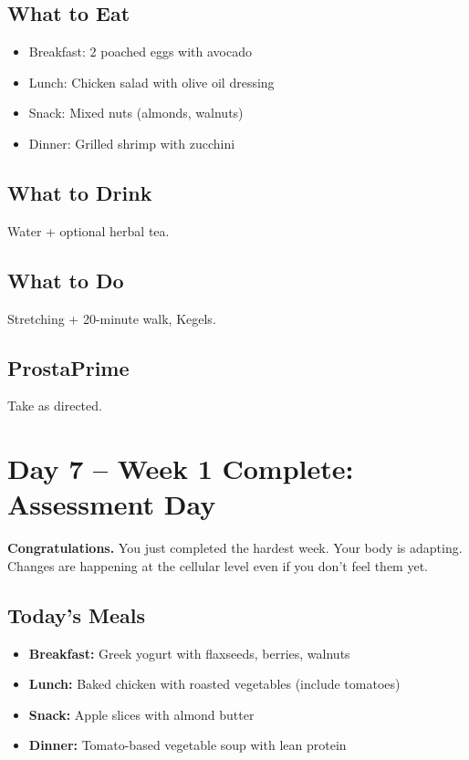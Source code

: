 \documentclass[11pt,oneside]{book}
\begin{document}
\section*{What to Eat}
\begin{itemize}[leftmargin=*]
\item Breakfast: 2 poached eggs with avocado
\item Lunch: Chicken salad with olive oil dressing
\item Snack: Mixed nuts (almonds, walnuts)
\item Dinner: Grilled shrimp with zucchini
\end{itemize}

\section*{What to Drink}
Water + optional herbal tea.

\section*{What to Do}
Stretching + 20-minute walk, Kegels.

\section*{ProstaPrime}
Take as directed.

\clearpage

\chapter*{Day 7 – Week 1 Complete: Assessment Day}

\textbf{Congratulations.} You just completed the hardest week. Your body is adapting. Changes are happening at the cellular level even if you don't feel them yet.

\section*{Today's Meals}
\begin{itemize}[leftmargin=*]
\item \textbf{Breakfast:} Greek yogurt with flaxseeds, berries, walnuts
\item \textbf{Lunch:} Baked chicken with roasted vegetables (include tomatoes)
\item \textbf{Snack:} Apple slices with almond butter
\item \textbf{Dinner:} Tomato-based vegetable soup with lean protein
\end{itemize}
\end{document}
